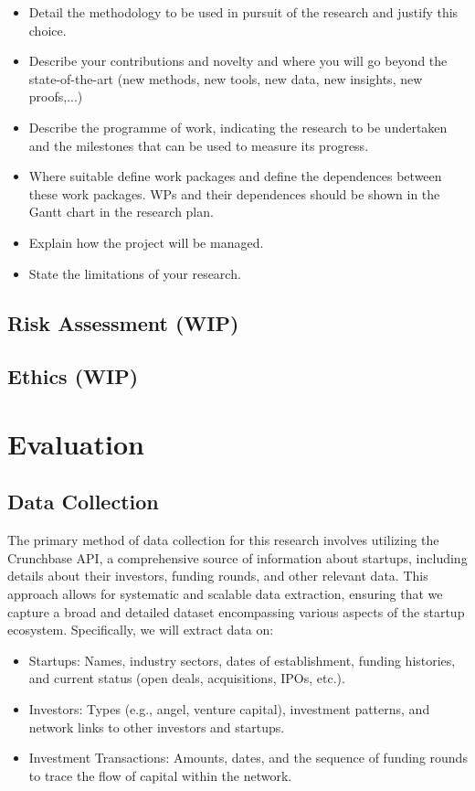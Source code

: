 \documentclass[a4paper,11pt]{article}
\begin{document}
\begin{itemize}
    \item Detail the methodology to be used in pursuit of the research and justify this choice.
    \item Describe your contributions and novelty and where you
    will go beyond the state-of-the-art (new methods, new tools,
    new data, new insights, new proofs,...)
    \item Describe the programme of work, indicating the research to be undertaken and the milestones that can be used to measure its progress.
    \item Where suitable define work packages and define the dependences
    between these work packages. WPs and their dependences should be
    shown in the Gantt chart in the research plan.
    \item Explain how the project will be managed.
    \item State the limitations of your research.
\end{itemize}

\subsection{Risk Assessment (WIP)}

\subsection{Ethics (WIP)}


\section{Evaluation}
\subsection{Data Collection}
The primary method of data collection for this research involves utilizing the Crunchbase API, a comprehensive source of information about startups, including details about their investors, funding rounds, and other relevant data. This approach allows for systematic and scalable data extraction, ensuring that we capture a broad and detailed dataset encompassing various aspects of the startup ecosystem. Specifically, we will extract data on:
\begin{itemize}
    \item Startups: Names, industry sectors, dates of establishment, funding histories, and current status (open deals, acquisitions, IPOs, etc.).
    \item Investors: Types (e.g., angel, venture capital), investment patterns, and network links to other investors and startups.
    \item Investment Transactions: Amounts, dates, and the sequence of funding rounds to trace the flow of capital within the network.
\end{itemize}
\end{document}
